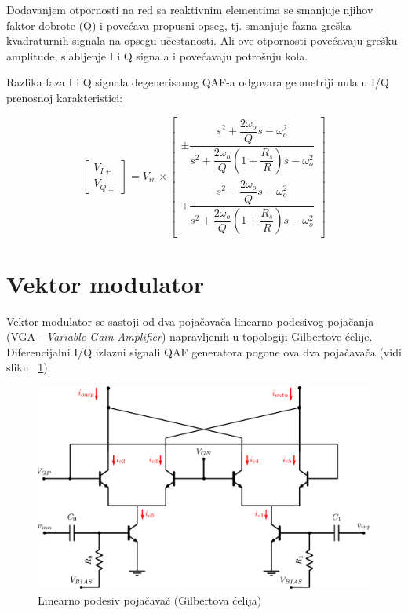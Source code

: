 \documentclass[journal,twocolumn,letterpaper]{IEEEJERM}
\begin{document}
Dodavanjem otpornosti na red sa reaktivnim elementima se smanjuje njihov faktor dobrote (Q) i povećava propusni opseg, tj. smanjuje fazna greška kvadraturnih signala na opsegu učestanosti. Ali ove otpornosti povećavaju grešku amplitude, slabljenje I i Q signala i povećavaju potrošnju kola.

Razlika faza I i Q signala degenerisanog QAF-a odgovara geometriji nula u I/Q prenosnoj karakteristici:

\[
\begin{bmatrix}
    V_{I\pm}      \\
    V_{Q\pm}    
\end{bmatrix}   
=
V_{in} \times
\begin{bmatrix}
    \pm \dfrac{s^2 + \dfrac{2\omega_{o}}{Q} s - \omega_{o}^2}{s^2 + \dfrac{2\omega_{o}}{Q}(1+\dfrac{R_s}{R}) s - \omega_{o}^2} \\
    \mp \dfrac{s^2 - \dfrac{2\omega_{o}}{Q} s - \omega_{o}^2}{s^2 + \dfrac{2\omega_{o}}{Q}(1+\dfrac{R_s}{R}) s - \omega_{o}^2}
\end{bmatrix}
\]

\section{Vektor modulator}

Vektor modulator se sastoji od dva pojačavača linearno podesivog pojačanja (VGA - \textit{Variable Gain Amplifier}) napravljenih u topologiji Gilbertove ćelije. Diferencijalni I/Q izlazni signali QAF generatora pogone ova dva pojačavača (vidi sliku ~\ref{fig:vga_vmod}).

\begin{figure}[!htbp]
  \centering
  \includegraphics[width=\linewidth]{vga_vmod.pdf}
  \caption{Linearno podesiv pojačavač (Gilbertova ćelija)}
  \label{fig:vga_vmod}
\end{figure}
\end{document}
